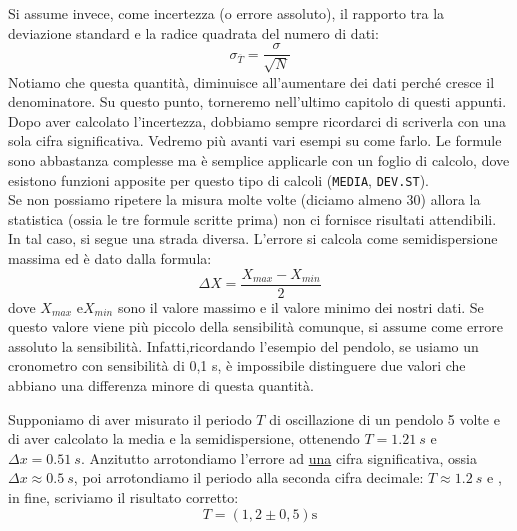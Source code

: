 Si assume invece, come incertezza (o errore assoluto), il rapporto tra la deviazione standard e la radice quadrata del numero di dati:
\[
\sigma_{\overline{T}}=\frac{\sigma}{\sqrt{N}}
\] 
Notiamo che questa quantità, diminuisce all'aumentare dei dati perché cresce il denominatore. Su questo punto, torneremo nell'ultimo capitolo di questi appunti.
Dopo aver calcolato l'incertezza, dobbiamo sempre ricordarci di scriverla con una sola cifra significativa. Vedremo più avanti vari esempi su come farlo. Le formule sono abbastanza complesse ma è semplice applicarle con un foglio di calcolo, dove esistono funzioni apposite per questo tipo di calcoli (\texttt{MEDIA}, \texttt{DEV.ST}). \\

Se non possiamo ripetere la misura molte volte (diciamo almeno 30) allora la statistica (ossia le tre formule scritte prima) non ci fornisce risultati attendibili. In tal caso, si segue una strada diversa. L'errore si calcola come semidispersione massima ed è dato dalla formula:
\[
\Delta X = \frac{X_{max}-X_{min}}{2}
\]
dove $X_{max}$  e$X_{min}$ sono il valore massimo e  il valore minimo dei nostri dati. Se questo valore viene più piccolo della sensibilità comunque, si assume come errore assoluto la sensibilità. Infatti,ricordando l'esempio del pendolo, se usiamo un cronometro con sensibilità di 0,1 s, è impossibile distinguere due valori che abbiano una differenza minore di questa quantità. 

Supponiamo di aver misurato il periodo $T$ di oscillazione di un pendolo 5 volte e di aver calcolato la media e la semidispersione, ottenendo $T=\SI{1,21}{s}$ e $\Delta x = \SI{0,51}{s}$. Anzitutto arrotondiamo l'errore ad \underline{una} cifra significativa, ossia $\Delta x \approx \SI{0,5}{s}$, poi arrotondiamo il periodo alla seconda cifra decimale: $T\approx \SI{1,2}{s}$ e , in fine, scriviamo il risultato corretto:
\[
T=\left(1,2 \pm 0,5 \right)\si{\second}
\]
